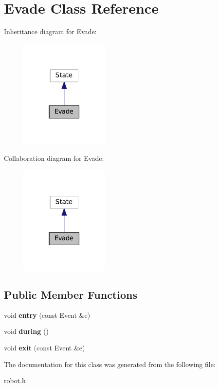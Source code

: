 \hypertarget{classEvade}{\section{Evade Class Reference}
\label{classEvade}
}


Inheritance diagram for Evade\+:
\nopagebreak
\begin{figure}[H]
\begin{center}
\leavevmode
\includegraphics[width=126pt]{classEvade__inherit__graph}
\end{center}
\end{figure}


Collaboration diagram for Evade\+:
\nopagebreak
\begin{figure}[H]
\begin{center}
\leavevmode
\includegraphics[width=126pt]{classEvade__coll__graph}
\end{center}
\end{figure}
\subsection*{Public Member Functions}
\begin{DoxyCompactItemize}
\item 
\hypertarget{classEvade_ad9069e4cb8ff9a674c6f782e3a993479}{void {\bfseries entry} (const Event \&e)}\label{classEvade_ad9069e4cb8ff9a674c6f782e3a993479}

\item 
\hypertarget{classEvade_ae158ab71688498147b7656fd5f48475d}{void {\bfseries during} ()}\label{classEvade_ae158ab71688498147b7656fd5f48475d}

\item 
\hypertarget{classEvade_aca8e9343f66389858fae7ca9b70d3296}{void {\bfseries exit} (const Event \&e)}\label{classEvade_aca8e9343f66389858fae7ca9b70d3296}

\end{DoxyCompactItemize}


The documentation for this class was generated from the following file\+:\begin{DoxyCompactItemize}
\item 
robot.\+h\end{DoxyCompactItemize}
